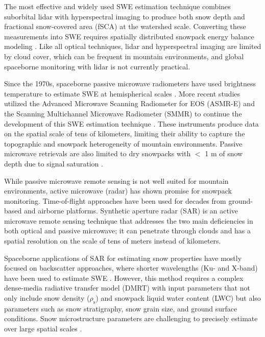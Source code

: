 The most effective and widely used SWE estimation technique combines suborbital lidar \citep{deemsFractalDistributionSnow2006,trujilloTopographicMeteorologicCanopy2007a} with hyperspectral imaging \citep{nolinMappingAlpineSnow1993} to produce both snow depth and fractional snow-covered area (fSCA) at the watershed scale. Converting these measurements into SWE requires spatially distributed snowpack energy balance modeling \citep{painterAirborneSnowObservatory2016}. Like all optical techniques, lidar and hyperspectral imaging are limited by cloud cover, which can be frequent in mountain environments, and global spaceborne monitoring with lidar is not currently practical.

Since the 1970s, spaceborne passive microwave radiometers have used brightness temperature to estimate SWE at hemispherical scales \citep{rangoUtilizationSpaceborneMicrowave1979}. More recent studies utilized the Advanced Microwave Scanning Radiometer for EOS (ASMR-E) and the Scanning Multichannel Microwave Radiometer (SMMR) to continue the development of this SWE estimation technique \citep{derksenTimeseriesAnalysisPassivemicrowavederived2002, vuyovichComparisonPassiveMicrowave2014}. These instruments produce data on the spatial scale of tens of kilometers, limiting their ability to capture the topographic and snowpack heterogeneity of mountain environments. Passive microwave retrievals are also limited to dry snowpacks with $<$ 1 m of snow depth due to signal saturation \citep{fosterQuantifyingUncertaintyPassive2005}.

While passive microwave remote sensing is not well suited for mountain environments, active microwave (radar) has shown promise for snowpack monitoring. Time-of-flight approaches have been used for decades from ground-based \citep{gublerUseMicrowaveFMCW1984,marshallFMCWRadarsSnow2008} and airborne \citep{mcgrathInterannualSnowAccumulation2018,lewisRegionalGreenlandAccumulation2017} platforms. Synthetic aperture radar (SAR) is an active microwave remote sensing technique that addresses the two main deficiencies in both optical and passive microwave; it can penetrate through clouds and has a spatial resolution on the scale of tens of meters instead of kilometers.

Spaceborne applications of SAR for estimating snow properties have mostly focused on backscatter approaches, where shorter wavelengths (Ku- and X-band) have been used to estimate SWE \citep{rottColdRegionsHydrology2010,yuehAirborneKuBandPolarimetric2009,kingInfluenceSnowMicrostructure2018,zhuSnowWaterEquivalent2021}. However, this method requires a complex dense-media radiative transfer model (DMRT) with input parameters that not only include snow density ($\rho_\mathrm{s}$) and snowpack liquid water content (LWC) but also parameters such as snow stratigraphy, snow grain size, and ground surface conditions. Snow microstructure parameters are challenging to precisely estimate over large spatial scales \citep{rutterEffectSnowMicrostructure2019}.

